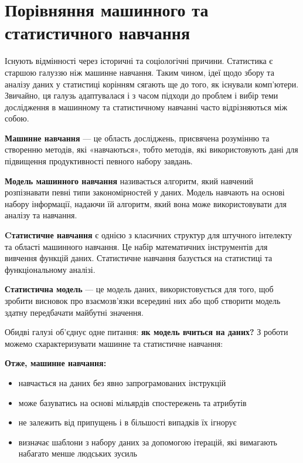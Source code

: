 \documentclass[14pt,a4paper]{extarticle}
\newcounter{e}
\numberwithin{equation}{section}
\numberwithin{figure}{section}
\begin{document}
	\section{Порівняння машинного та статистичного навчання}
		
	Існують відмінності через історичні та соціологічні причини. Статистика є старшою галуззю ніж машинне навчання. Таким чином, ідеї щодо збору та аналізу даних у статистиці корінням сягають ще до того, як існували комп’ютери. Звичайно, ця галузь адаптувалася і з часом підходи до проблем і вибір теми дослідження в машинному та статистичному навчанні часто відрізняються між собою. \newline
	
	\textbf{Машинне навчання} — це область досліджень, присвячена розумінню та створенню методів, які «навчаються», тобто методів, які використовують дані для підвищення продуктивності певного набору завдань. \newline

    \textbf{Модель машинного навчання} називається алгоритм, який навчений розпізнавати певні типи закономірностей у даних. Модель навчають на основі набору інформації, надаючи їй алгоритм, який вона може використовувати для аналізу та навчання. \newline
    
    \textbf{Cтатистичне навчання} є однією з класичних структур для штучного інтелекту та області машинного навчання. Це набір математичних інструментів для вивчення функцій даних. Статистичне навчання базується на статистиці та функціональному аналізі. \newline
    
    \textbf{Статистична модель} — це модель даних, використовується для того, щоб зробити висновок про взаємозв'язки всередині них або щоб створити модель здатну передбачати майбутні значення. \newline
    
    Обидві галузі об'єднує одне питання: \textbf{як модель вчиться на даних?} \newline З роботи \cite{difference2019} можемо схарактеризувати машинне та статистичне навчання: \newline
	
	\textbf{Отже, машинне навчання:}
    
    \begin{itemize}
        \item навчається на даних без явно запрограмованих інструкцій
        \item може базуватись на основі мільярдів спостережень та атрибутів
        \item не залежить від припущень і в більшості випадків їх ігнорує
        \item визначає шаблони з набору даних за допомогою ітерацій, які вимагають набагато менше людських зусиль
    \end{itemize}
    
\end{document}
